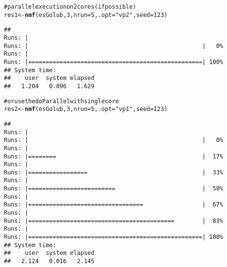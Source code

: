 \documentclass[a4paper]{article}\usepackage{graphicx, color}
\makeatletter
\newcommand{\hlfunctioncall}[1]{\textcolor[rgb]{0.501960784313725,0,0.329411764705882}{\textbf{#1}}}%
\newcommand{\hlstring}[1]{\textcolor[rgb]{0.6,0.6,1}{#1}}%
\newcommand{\hlcomment}[1]{\textcolor[rgb]{0.180392156862745,0.6,0.341176470588235}{#1}}%
\newenvironment{kframe}{%
 \def\at@end@of@kframe{}%
 \ifinner\ifhmode%
  \def\at@end@of@kframe{\end{minipage}}%
  \begin{minipage}{\columnwidth}%
 \fi\fi%
 \def\FrameCommand##1{\hskip\@totalleftmargin \hskip-\fboxsep
 \colorbox{shadecolor}{##1}\hskip-\fboxsep
     \hskip-\linewidth \hskip-\@totalleftmargin \hskip\columnwidth}%
 \MakeFramed {\advance\hsize-\width
   \@totalleftmargin\z@ \linewidth\hsize
   \@setminipage}}%
 {\par\unskip\endMakeFramed%
 \at@end@of@kframe}
\newenvironment{knitrout}{}{} %
\makeatother
\begin{document}
\begin{knitrout}
\color{fgcolor}\begin{kframe}
\begin{alltt}
\hlcomment{# parallel execution on 2 cores (if possible)}
res1 <- \hlfunctioncall{nmf}(esGolub, 3, nrun = 5, .opt = \hlstring{"vp2"}, seed = 123)
\end{alltt}


{\ttfamily\noindent\itshape\color{messagecolor}{\#\# NMF algorithm: 'brunet'}}

{\ttfamily\noindent\itshape\color{messagecolor}{\#\# Multiple runs: 5}}

{\ttfamily\noindent\itshape\color{messagecolor}{\#\# Mode: parallel (2/4 core(s))}}\begin{verbatim}
## 
Runs: |                                                        
Runs: |                                                  |   0%
Runs: |                                                        
Runs: |==================================================| 100%
## System time:
##    user  system elapsed 
##   1.204   0.096   1.629
\end{verbatim}
\begin{alltt}

\hlcomment{# or use the doParallel with single core}
res2 <- \hlfunctioncall{nmf}(esGolub, 3, nrun = 5, .opt = \hlstring{"vp1"}, seed = 123)
\end{alltt}


{\ttfamily\noindent\itshape\color{messagecolor}{\#\# NMF algorithm: 'brunet'}}

{\ttfamily\noindent\itshape\color{messagecolor}{\#\# Multiple runs: 5}}

{\ttfamily\noindent\itshape\color{messagecolor}{\#\# Mode: sequential [foreach:doParallel]}}\begin{verbatim}
## 
Runs: |                                                        
Runs: |                                                  |   0%
Runs: |                                                        
Runs: |========                                          |  17%
Runs: |                                                        
Runs: |=================                                 |  33%
Runs: |                                                        
Runs: |=========================                         |  50%
Runs: |                                                        
Runs: |=================================                 |  67%
Runs: |                                                        
Runs: |==========================================        |  83%
Runs: |                                                        
Runs: |==================================================| 100%
## System time:
##    user  system elapsed 
##   2.124   0.016   2.145
\end{verbatim}
\begin{alltt}


\end{alltt}
\end{kframe}
\end{knitrout}
\end{document}
